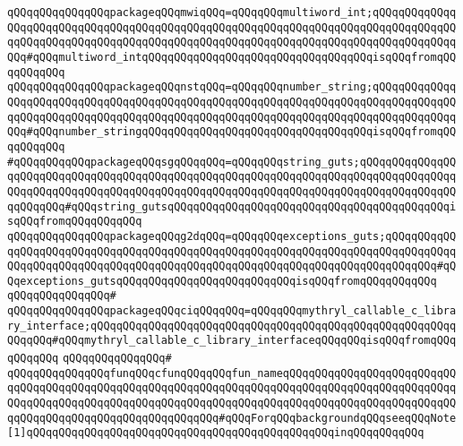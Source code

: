 \verb|qQQqqQQqqQQqqQQqpackageqQQqmwiqQQq=qQQqqQQqmultiword_int;qQQqqQQqqQQqqQQqqQQqqQQqqQQqqQQqqQQqqQQqqQQqqQQqqQQqqQQqqQQqqQQqqQQqqQQqqQQqqQQqqQQqqQQqqQQqqQQqqQQqqQQqqQQqqQQqqQQqqQQqqQQqqQQqqQQqqQQqqQQqqQQqqQQqqQQqqQQq#qQQqmultiword_intqQQqqQQqqQQqqQQqqQQqqQQqqQQqqQQqqQQqisqQQqfromqQQqqQQqqQQq|\newline
\verb|qQQqqQQqqQQqqQQqpackageqQQqnstqQQq=qQQqqQQqnumber_string;qQQqqQQqqQQqqQQqqQQqqQQqqQQqqQQqqQQqqQQqqQQqqQQqqQQqqQQqqQQqqQQqqQQqqQQqqQQqqQQqqQQqqQQqqQQqqQQqqQQqqQQqqQQqqQQqqQQqqQQqqQQqqQQqqQQqqQQqqQQqqQQqqQQqqQQqqQQq#qQQqnumber_stringqQQqqQQqqQQqqQQqqQQqqQQqqQQqqQQqqQQqisqQQqfromqQQqqQQqqQQq|\newline
\verb|#qQQqqQQqqQQqpackageqQQqsgqQQqqQQq=qQQqqQQqstring_guts;qQQqqQQqqQQqqQQqqQQqqQQqqQQqqQQqqQQqqQQqqQQqqQQqqQQqqQQqqQQqqQQqqQQqqQQqqQQqqQQqqQQqqQQqqQQqqQQqqQQqqQQqqQQqqQQqqQQqqQQqqQQqqQQqqQQqqQQqqQQqqQQqqQQqqQQqqQQqqQQqqQQq#qQQqstring_gutsqQQqqQQqqQQqqQQqqQQqqQQqqQQqqQQqqQQqqQQqqQQqisqQQqfromqQQqqQQqqQQq|\newline
\verb|qQQqqQQqqQQqqQQqpackageqQQqg2dqQQq=qQQqqQQqexceptions_guts;qQQqqQQqqQQqqQQqqQQqqQQqqQQqqQQqqQQqqQQqqQQqqQQqqQQqqQQqqQQqqQQqqQQqqQQqqQQqqQQqqQQqqQQqqQQqqQQqqQQqqQQqqQQqqQQqqQQqqQQqqQQqqQQqqQQqqQQqqQQqqQQqqQQq#qQQqexceptions_gutsqQQqqQQqqQQqqQQqqQQqqQQqqQQqisqQQqfromqQQqqQQqqQQq|\newline
\verb|qQQqqQQqqQQqqQQq#|\newline
\verb|qQQqqQQqqQQqqQQqpackageqQQqciqQQqqQQq=qQQqqQQqmythryl_callable_c_library_interface;qQQqqQQqqQQqqQQqqQQqqQQqqQQqqQQqqQQqqQQqqQQqqQQqqQQqqQQqqQQqqQQq#qQQqmythryl_callable_c_library_interfaceqQQqqQQqisqQQqfromqQQqqQQqqQQq|\newline
\verb|qQQqqQQqqQQqqQQq#|\newline
\verb|qQQqqQQqqQQqqQQqfunqQQqcfunqQQqqQQqfun_nameqQQqqQQqqQQqqQQqqQQqqQQqqQQqqQQqqQQqqQQqqQQqqQQqqQQqqQQqqQQqqQQqqQQqqQQqqQQqqQQqqQQqqQQqqQQqqQQqqQQqqQQqqQQqqQQqqQQqqQQqqQQqqQQqqQQqqQQqqQQqqQQqqQQqqQQqqQQqqQQqqQQqqQQqqQQqqQQqqQQqqQQqqQQqqQQqqQQqqQQq#qQQqForqQQqbackgroundqQQqseeqQQqNote[1]qQQqqQQqqQQqqQQqqQQqqQQqqQQqqQQqqQQqqQQqqQQqqQQqinqQQqqQQqqQQq|\newline
